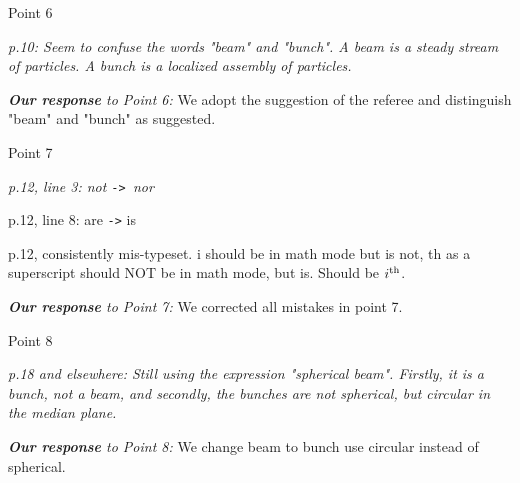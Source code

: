 \documentclass[10pt]{report}
\begin{document}
Point 6

{\it p.10: Seem to confuse the words "beam" and "bunch". A beam is a steady stream
of particles. A bunch is a localized assembly of particles.}

{\it {\bf Our response} to Point 6: }
We adopt the suggestion of the referee and distinguish "beam" and "bunch" as suggested.


Point 7

{\it p.12, line 3: not {\tt -> }nor 

p.12, line 8: are {\tt ->} is 

p.12, consistently mis-typeset. i should be in math mode but is not, th
as a superscript should NOT be in math mode, but is. Should be 
$i^{\rm th}$. 
}

{\it {\bf Our response} to Point 7: }
We corrected all mistakes in point 7.

Point 8

{\it p.18 and elsewhere: Still using the expression "spherical beam". Firstly,
it is a bunch, not a beam, and secondly, the bunches are not spherical, 
but circular in the median plane.
}

{\it {\bf Our response} to Point 8: } We change beam to bunch use circular instead of spherical.
\end{document}

